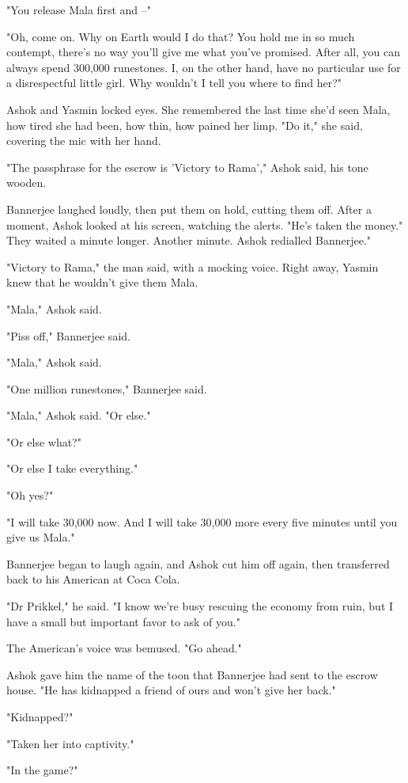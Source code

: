 "You release Mala first and --"

"Oh, come on. Why on Earth would I do that? You hold me in so much
contempt, there's no way you'll give me what you've promised. After
all, you can always spend 300,000 runestones. I, on the other hand,
have no particular use for a disrespectful little girl. Why
wouldn't I tell you where to find her?"

Ashok and Yasmin locked eyes. She remembered the last time she'd
seen Mala, how tired she had been, how thin, how pained her limp.
"Do it," she said, covering the mic with her hand.

"The passphrase for the escrow is 'Victory to Rama'," Ashok said,
his tone wooden.

Bannerjee laughed loudly, then put them on hold, cutting them off.
After a moment, Ashok looked at his screen, watching the alerts.
"He's taken the money." They waited a minute longer. Another
minute. Ashok redialled Bannerjee."

"Victory to Rama," the man said, with a mocking voice. Right away,
Yasmin knew that he wouldn't give them Mala.

"Mala," Ashok said.

"Piss off," Bannerjee said.

"Mala," Ashok said.

"One million runestones," Bannerjee said.

"Mala," Ashok said. "Or else."

"Or else what?"

"Or else I take everything."

"Oh yes?"

"I will take 30,000 now. And I will take 30,000 more every five
minutes until you give us Mala."

Bannerjee began to laugh again, and Ashok cut him off again, then
transferred back to his American at Coca Cola.

"Dr Prikkel," he said. "I know we're busy rescuing the economy from
ruin, but I have a small but important favor to ask of you."

The American's voice was bemused. "Go ahead."

Ashok gave him the name of the toon that Bannerjee had sent to the
escrow house. "He has kidnapped a friend of ours and won't give her
back."

"Kidnapped?"

"Taken her into captivity."

"In the game?"


